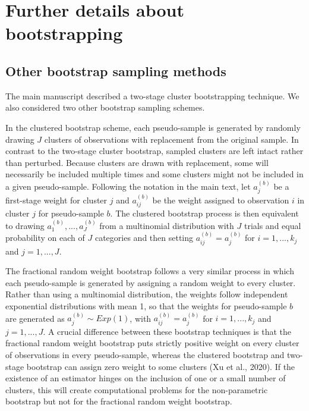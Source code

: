\documentclass[
  american,
  man, donotrepeattitle,floatsintext]{apa7}
\begin{document}
\section{Further details about bootstrapping}\label{bootstrap-details}

\subsection*{Other bootstrap sampling methods}\label{other-bootstrap-sampling-methods}

The main manuscript described a two-stage cluster bootstrapping technique. We also considered two other bootstrap sampling schemes.

In the clustered bootstrap scheme, each pseudo-sample is generated by randomly drawing \(J\) clusters of observations with replacement from the original sample.
In contrast to the two-stage cluster bootstrap, sampled clusters are left intact rather than perturbed.
Because clusters are drawn with replacement, some will necessarily be included multiple times and some clusters might not be included in a given pseudo-sample.
Following the notation in the main text, let \(a_j^{(b)}\) be a first-stage weight for cluster \(j\) and \(a_{ij}^{(b)}\) be the weight assigned to observation \(i\) in cluster \(j\) for pseudo-sample \(b\).
The clustered bootstrap process is then equivalent to drawing \(a_1^{(b)},...,a_J^{(b)}\) from a multinomial distribution with \(J\) trials and equal probability on each of \(J\) categories and then setting \(a_{ij}^{(b)} = a^{(b)}_j\) for \(i = 1,...,k_j\) and \(j = 1,...,J\).

The fractional random weight bootstrap follows a very similar process in which each pseudo-sample is generated by assigning a random weight to every cluster.
Rather than using a multinomial distribution, the weights follow independent exponential distributions with mean 1, so that the weights for pseudo-sample \(b\) are generated as \(a^{(b)}_j \sim Exp(1)\), with \(a_{ij}^{(b)} = a^{(b)}_j\) for \(i = 1,...,k_j\) and \(j = 1,...,J\).
A crucial difference between these bootstrap techniques is that the fractional random weight bootstrap puts strictly positive weight on every cluster of observations in every pseudo-sample, whereas the clustered bootstrap and two-stage bootstrap can assign zero weight to some clusters (Xu et al., 2020).
If the existence of an estimator hinges on the inclusion of one or a small number of clusters, this will create computational problems for the non-parametric bootstrap but not for the fractional random weight bootstrap.
\end{document}

